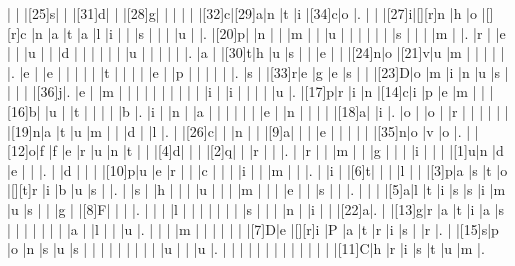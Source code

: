 \documentclass[12pt]{article}
\begin{document}
\begin{Puzzle}{22}{24}
  |{}  |{}  |[25]s|{}  |{}  |[31]d|{}  |{}  |[28]g|{}  |{}  |{}  |{}  |{}  |[32]c|[29]a|n   |t   |i   |[34]c|o   |.
  |{}  |{}  |[27]i|[][r]n   |h   |o   |[][r]c   |n   |a   |t   |a   |l   |i   |{}  |{}  |s   |{}  |{}  |{}  |u   |{}  |.
  |[20]p|{}  |n   |{}  |{}  |m   |{}  |{}  |u   |{}  |{}  |{}  |{}  |{}  |{}  |s   |{}  |{}  |{}  |m   |{}  |.
  |r   |{}  |e   |{}  |{}  |u   |{}  |{}  |d   |{}  |{}  |{}  |{}  |{}  |{}  |u   |{}  |{}  |{}  |{}  |{}  |.
  |a   |{}  |[30]t|h   |u   |s   |{}  |{}  |e   |{}  |{}  |[24]n|o   |[21]v|u   |m   |{}  |{}  |{}  |{}  |{}  |.
  |e   |{}  |e   |{}  |{}  |{}  |{}  |{}  |t   |{}  |{}  |{}  |{}  |e   |{}  |p   |{}  |{}  |{}  |{}  |{}  |.
  |s   |{}  |[33]r|e   |g   |e   |s   |{}  |{}  |[23]D|o   |m   |i   |n   |u   |s   |{}  |{}  |{}  |{}  |[36]j|.
  |e   |{}  |m   |{}  |{}  |{}  |{}  |{}  |{}  |{}  |{}  |{}  |{}  |i   |{}  |i   |{}  |{}  |{}  |{}  |u   |.
  |[17]p|r   |i   |n   |[14]c|i   |p   |e   |m   |{}  |{}  |[16]b|{}  |u   |{}  |t   |{}  |{}  |{}  |{}  |b   |.
  |i   |{}  |n   |{}  |a   |{}  |{}  |{}  |{}  |{}  |{}  |e   |{}  |n   |{}  |{}  |{}  |{}  |[18]a|{}  |i   |.
  |o   |{}  |o   |{}  |r   |{}  |{}  |{}  |{}  |{}  |{}  |[19]n|a   |t   |u   |m   |{}  |{}  |d   |{}  |l   |.
  |{}  |[26]c|{}  |{}  |n   |{}  |{}  |[9]a|{}  |{}  |{}  |e   |{}  |{}  |{}  |{}  |{}  |[35]n|o   |v   |o   |.
  |{}  |[12]o|f   |f   |e   |r   |u   |n   |t   |{}  |{}  |[4]d|{}  |{}  |{}  |[2]q|{}  |{}  |r   |{}  |{}  |.
  |{}  |r   |{}  |{}  |m   |{}  |{}  |g   |{}  |{}  |{}  |i   |{}  |{}  |{}  |[1]u|n   |d   |e   |{}  |{}  |.
  |{}  |d   |{}  |{}  |{}  |[10]p|u   |e   |r   |{}  |{}  |c   |{}  |{}  |{}  |i   |{}  |{}  |m   |{}  |{}  |.
  |{}  |i   |{}  |[6]t|{}  |{}  |{}  |l   |{}  |{}  |[3]p|a   |s   |t   |o   |[][t]r   |i   |b   |u   |s   |{}  |.
  |{}  |s   |{}  |h   |{}  |{}  |{}  |u   |{}  |{}  |{}  |m   |{}  |{}  |{}  |e   |{}  |{}  |s   |{}  |{}  |.
  |{}  |{}  |{}  |[5]a|l   |t   |i   |s   |s   |i   |m   |u   |s   |{}  |{}  |g   |{}  |[8]F|{}  |{}  |{}  |.
  |{}  |{}  |{}  |l   |{}  |{}  |{}  |{}  |{}  |{}  |{}  |s   |{}  |{}  |{}  |n   |{}  |i   |{}  |{}  |[22]a|.
  |{}  |[13]g|r   |a   |t   |i   |a   |s   |{}  |{}  |{}  |{}  |{}  |{}  |{}  |a   |{}  |l   |{}  |{}  |u   |.
  |{}  |{}  |{}  |m   |{}  |{}  |{}  |{}  |{}  |{}  |[7]D|e   |[][r]i   |P   |a   |t   |r   |i   |s   |{}  |r   |.
  |{}  |[15]s|p   |o   |n   |s   |u   |s   |{}  |{}  |{}  |{}  |{}  |{}  |{}  |{}  |{}  |u   |{}  |{}  |u   |.
  |{}  |{}  |{}  |{}  |{}  |{}  |{}  |{}  |{}  |{}  |{}  |{}  |{}  |[11]C|h   |r   |i   |s   |t   |u   |m   |.
\end{Puzzle}
\end{document}
